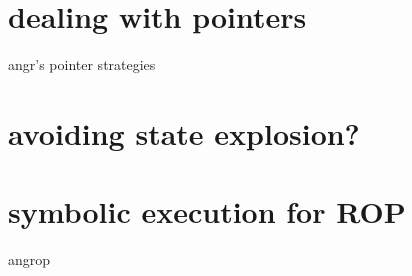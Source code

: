 \section{dealing with pointers}
\begin{frame}{angr's pointer strategies}
\end{frame}

\section{avoiding state explosion?}

\section{symbolic execution for ROP}
\begin{frame}{angrop}
\end{frame}

